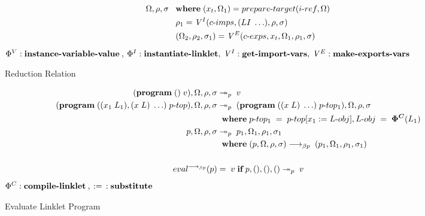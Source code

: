 \documentclass[sigplan,screen,anonymous]{acmart}
\def\dash {\text{-}}
\begin{document}
\begin{figure}[tbp]
\begin{align*}
    \Omega, \rho, \sigma\; &\;\; \where (x_t, \Omega_1) = prepare\dash target(i\dash ref, \Omega) \\
    \;          &\;\; \rho_1 = \mathit{V}^I(c\dash imps, (LI\; \ldots), \rho, \sigma) \\
    \;          &\;\; (\Omega_2, \rho_2, \sigma_1) = \mathit{V}^E(c\dash exps, x_t, \Omega_1, \rho_1, \sigma) \\
  \end{align*}
  \hfill \footnotesize $\Phi^V : \textbf{instance\dash variable\dash value}\:,\: \Phi^I : \textbf{instantiate\dash linklet},\: \mathit{V}^I : \textbf{get\dash import\dash vars},\: \mathit{V}^E : \textbf{make\dash exports\dash vars}$
\caption{Reduction Relation}
\label{fig:reduction}
\end{figure}

\newcommand{\runio}[1]{run\dash prog(#1, \Omega, \rho, \sigma)\;}
\newcommand{\prog}[2]{(\textbf{program}\; (\textbf{use\dash linklets}\;#1 )\;#2)}
\def\transrel {&\twoheadrightarrow_{p}\;}

\begin{figure}[tbp]
  \begin{align*}
    (\textbf{program}\; ()\;v), \Omega, \rho, \sigma \transrel v \\
    (\textbf{program}\; ((x_1\;L_1),(x\;L)\;\ldots)\;p\dash top), \Omega, \rho, \sigma \transrel (\textbf{program}\; ((x\;L)\;\ldots)\;p\dash top_1 ), \Omega, \rho, \sigma \\
    \;          &\;\; \where p\dash top_1\; =\; p\dash top[x_1 := L\dash obj], L\dash obj\;=\;\bm{\Phi^C}(L_1) \\
    p, \Omega, \rho, \sigma \transrel p_1, \Omega_1, \rho_1, \sigma_1 \\
    \;          &\;\; \where (p, \Omega, \rho, \sigma) \longrightarrow_{\beta p}\; (p_1, \Omega_1, \rho_1, \sigma_1)  \\ \\
    eval^{\longrightarrow_{\beta p}}(p) &=\; v\; \textbf{if}\; p, (), (), () \twoheadrightarrow_p\; v
  \end{align*}
  \hfill \footnotesize $\Phi^C : \textbf{compile\dash linklet}\:,\: :=\:\: : \textbf{substitute}$
\caption{Evaluate Linklet Program}
\label{fig:main}
\end{figure}
\end{document}
